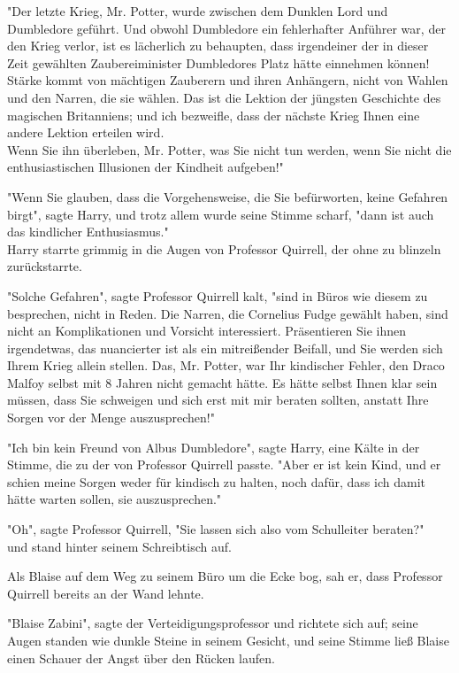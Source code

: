 {"Der letzte Krieg, Mr. Potter, wurde zwischen dem Dunklen Lord und Dumbledore geführt. Und obwohl Dumbledore ein fehlerhafter Anführer war, der den Krieg verlor, ist es lächerlich zu behaupten, dass irgendeiner der in dieser Zeit gewählten Zaubereiminister Dumbledores Platz hätte einnehmen können! Stärke kommt von mächtigen Zauberern und ihren Anhängern, nicht von Wahlen und den Narren, die sie wählen. Das ist die Lektion der jüngsten Geschichte des magischen Britanniens; und ich bezweifle, dass der nächste Krieg Ihnen eine andere Lektion erteilen wird.\\ Wenn Sie ihn überleben, Mr. Potter, was Sie nicht tun werden, wenn Sie nicht die enthusiastischen Illusionen der Kindheit aufgeben!"

"Wenn Sie glauben, dass die Vorgehensweise, die Sie befürworten, keine Gefahren birgt", sagte Harry, und trotz allem wurde seine Stimme scharf, "dann ist auch das kindlicher Enthusiasmus."\\ Harry starrte grimmig in die Augen von Professor Quirrell, der ohne zu blinzeln zurückstarrte.

"Solche Gefahren", sagte Professor Quirrell kalt, "sind in Büros wie diesem zu besprechen, nicht in Reden. Die Narren, die Cornelius Fudge gewählt haben, sind nicht an Komplikationen und Vorsicht interessiert. Präsentieren Sie ihnen irgendetwas, das nuancierter ist als ein mitreißender Beifall, und Sie werden sich Ihrem Krieg allein stellen. Das, Mr. Potter, war Ihr kindischer Fehler, den Draco Malfoy selbst mit 8 Jahren nicht gemacht hätte. Es hätte selbst Ihnen klar sein müssen, dass Sie schweigen und sich erst mit mir beraten sollten, anstatt Ihre Sorgen vor der Menge auszusprechen!"

"Ich bin kein Freund von Albus Dumbledore", sagte Harry, eine Kälte in der Stimme, die zu der von Professor Quirrell passte. "Aber er ist kein Kind, und er schien meine Sorgen weder für kindisch zu halten, noch dafür, dass ich damit hätte warten sollen, sie auszusprechen."

"Oh", sagte Professor Quirrell, "Sie lassen sich also vom Schulleiter beraten?"\\ und stand hinter seinem Schreibtisch auf.

Als Blaise auf dem Weg zu seinem Büro um die Ecke bog, sah er, dass Professor Quirrell bereits an der Wand lehnte.

"Blaise Zabini", sagte der Verteidigungsprofessor und richtete sich auf; seine Augen standen wie dunkle Steine in seinem Gesicht, und seine Stimme ließ Blaise einen Schauer der Angst über den Rücken laufen.

}
